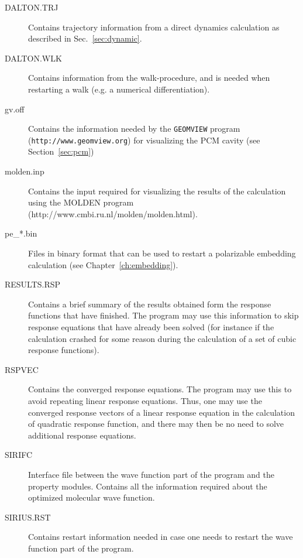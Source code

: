 \begin{description}
\item[DALTON.TRJ] Contains trajectory information from a direct
dynamics calculation as described in
Sec.~\ref{sec:dynamic}.

\item[DALTON.WLK] Contains information from the walk-procedure, and is
needed when restarting a walk (e.g. a numerical differentiation).

\item[gv.off] Contains the information needed by the \verb|GEOMVIEW|
  program (\verb|http://www.geomview.org|) for visualizing the PCM
  cavity (see Section~\ref{sec:pcm})

\item[molden.inp] Contains the input required for visualizing the
  results of the calculation using the MOLDEN program
  (http://www.cmbi.ru.nl/molden/molden.html).

\item[pe\_*.bin] Files in binary format that can be used to restart a
  polarizable embedding calculation (see Chapter~\ref{ch:embedding}).

\item[RESULTS.RSP] Contains a brief summary of the results obtained
  form the response functions that have finished. The program may use
  this information to skip response equations that have already been
  solved (for instance if the calculation crashed for some reason
  during the calculation of a set of cubic response functions).

\item[RSPVEC] Contains the converged response equations. The program
  may use this to avoid repeating linear response equations. Thus, one
  may use the converged response vectors of a linear response equation
  in the calculation of quadratic response function, and there may
  then be no need to solve additional response equations.

\item[SIRIFC] Interface file between the wave function part of the
  program and the property modules. Contains all the information
  required about the optimized molecular wave function.

\item[SIRIUS.RST] Contains restart information needed in case one
  needs to restart the wave function part of the program.
\end{description}
